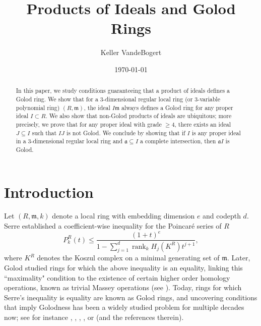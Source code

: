 \documentclass[10pt]{amsart}
\theoremstyle{definition}
\theoremstyle{remark}
\newtheorem{the context}[theorem]{The Context}
\numberwithin{equation}{theorem}
\numberwithin{equation}{section}
\newcommand{\rank}{\operatorname{rank}}
\newcommand{\ideal}[1]{\mathfrak{#1}}
\newcommand{\m}{\ideal{m}}
\renewcommand{\geq}{\geqslant}
\renewcommand{\leq}{\leqslant}
\newcommand{\mfa}{\mathfrak{a}}
\begin{document}
\title{Products of Ideals and Golod Rings}



\author{Keller VandeBogert }
\date{\today}

\maketitle

\begin{abstract}
    In this paper, we study conditions guaranteeing that a product of ideals defines a Golod ring. We show that for a $3$-dimensional regular local ring (or $3$-variable polynomial ring) $(R , \m)$, the ideal $I \m$ always defines a Golod ring for any proper ideal $I \subset R$. We also show that non-Golod products of ideals are ubiquitous; more precisely, we prove that for any proper ideal with grade $\geq 4$, there exists an ideal $J \subseteq I$ such that $IJ$ is not Golod. We conclude by showing that if $I$ is any proper ideal in a $3$-dimensional regular local ring and $\mfa \subseteq I$ a complete intersection, then $\mfa I$ is Golod. 
\end{abstract}

\section{Introduction}

Let $(R , \m ,k )$ denote a local ring with embedding dimension $e$ and codepth $d$. Serre established a coefficient-wise inequality for the Poincar\'e series of $R$
$$P^R_k (t) \leq \frac{(1+t)^e}{1 - \sum_{j=1}^d \rank_k H_j (K^R) t^{j+1}},$$
where $K^R$ denotes the Koszul complex on a minimal generating set of $\m$. Later, Golod studied rings for which the above inequality is an equality, linking this ``maximality" condition to the existence of certain higher order homology operations, known as trivial Massey operations (see \cite{golod1962}). Today, rings for which Serre's inequality is equality are known as Golod rings, and uncovering conditions that imply Golodness has been a widely studied problem for multiple decades now; see for instance \cite{peeva19960}, \cite{srinivasan1989algebra}, \cite{herzog2013ordinary}, \cite{christensen2018golod}, or \cite{herzog2018koszul} (and the references therein).
\end{document}

